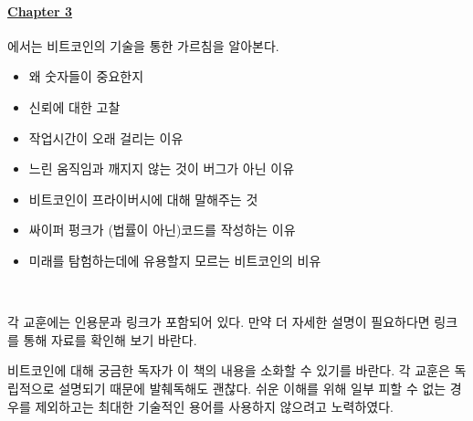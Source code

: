 \paragraph{\hyperref[ch:technology]{Chapter 3}}{에서는 비트코인의 기술을 통한 가르침을 알아본다.
\begin{itemize}
	\item 왜 숫자들이 중요한지
	\item 신뢰에 대한 고찰
	\item 작업시간이 오래 걸리는 이유
	\item 느린 움직임과 깨지지 않는 것이 버그가 아닌 이유
	\item 비트코인이 프라이버시에 대해 말해주는 것
	\item 싸이퍼 펑크가 (법률이 아닌)코드를 작성하는 이유
	\item 미래를 탐험하는데에 유용할지 모르는 비트코인의 비유
	\end{itemize}}
	
	~
	
	각 교훈에는 인용문과 링크가 포함되어 있다. 만약 더 자세한 설명이 필요하다면 링크를 통해 자료를 확인해 보기
	바란다.
	
	비트코인에 대해 궁금한 독자가 이 책의 내용을 소화할 수 있기를 바란다. 각 교훈은 독립적으로 설명되기 때문에
	발췌독해도 괜찮다. 쉬운 이해를 위해 일부 피할 수 없는 경우를 제외하고는 최대한 기술적인 용어를 사용하지 않으려고 노력하였다.
	
